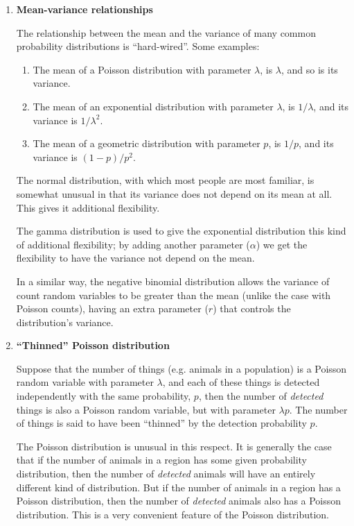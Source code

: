 \begin{enumerate}

\item \textbf{Mean-variance relationships} 

The relationship between the mean and the variance of many common probability distributions is ``hard-wired''. Some examples:

  \begin{enumerate}
  \item The mean of a Poisson distribution with parameter $\lambda$, is $\lambda$, and so is its variance.
  \item The mean of an exponential distribution with parameter $\lambda$, is $1/\lambda$, and its variance is $1/\lambda^2$.
  \item The mean of a geometric distribution with parameter $p$, is $1/p$, and its variance is $(1-p)/p^2$.
  \end{enumerate}
  
The normal distribution, with which most people are most familiar, is somewhat unusual in that its variance does not depend on its mean at all. This gives it additional flexibility. 

The gamma distribution is used to give the exponential distribution this kind of additional flexibility; by adding another parameter ($\alpha$) we get the flexibility to have the variance not depend on the mean.

In a similar way, the negative binomial distribution allows the variance of count random variables to be greater than the mean (unlike the case with Poisson counts), having an extra parameter ($r$) that controls the distribution's variance.

\item \textbf{``Thinned'' Poisson distribution}

Suppose that the number of things (e.g. animals in a population) is a Poisson random variable with parameter $\lambda$, and each of these things is detected independently with the same probability, $p$, then the number of \textit{detected} things is also a Poisson random variable, but with parameter $\lambda p$. The number of things is said to have been ``thinned'' by the detection probability $p$.

The Poisson distribution is unusual in this respect. It is generally the case that if the number of animals in a region has some given probability distribution, then the number of \textit{detected} animals will have an entirely different kind of distribution. But if the number of animals in a region has a Poisson distribution, then the number of \textit{detected} animals also has a Poisson distribution. This is a very convenient feature of the Poisson distribution.


\end{enumerate}
